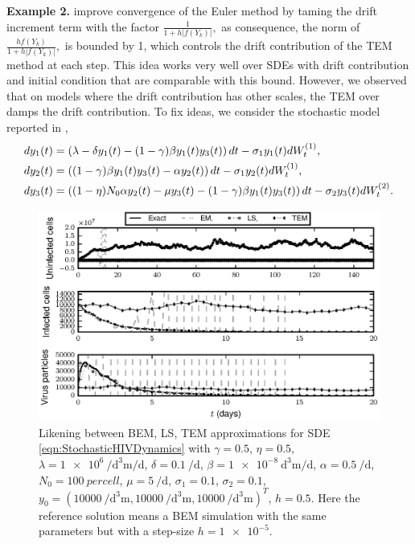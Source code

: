 \documentclass[sort&compress, preprint]{elsarticle}
\theoremstyle{definition}
\theoremstyle{plain}%
\theoremstyle{remark}
\newcommand{\SM}{LS\xspace}
\begin{document}
	
{\textbf{Example 2.}}
	\citeauthor{Hutzenthaler2012a} improve convergence of the Euler method by taming the drift increment term with 
	the factor
	$
	\frac{1}{1 + h |f(Y_k)|},
	$
	as consequence, the norm of  
	$
	\frac{h f(Y_k)}{1 + h |f(Y_k)|},
	$ is bounded by 1, which  controls the drift contribution of the TEM method at each step. This idea works very well
	over SDEs with drift contribution and initial condition that are comparable with this bound. However, we observed
	that on models where the	drift contribution has other scales, the TEM over damps the drift contribution. To fix
	ideas, we consider the	stochastic model reported in \cite{Dalal2008},
	\begin{align}\label{eqn:StochasticHIVDynamics}
	dy_1(t) &=
	\left(
	\lambda -\delta y_1(t) - (1 - \gamma) \beta y_1(t) y_3(t)
	\right)dt
	-\sigma_1 y_1(t) dW^{(1)}_t, 
	\notag \\
	dy_2(t) &= 
	\left(
	(1- \gamma) \beta y_1(t) y_3(t) - \alpha y_2(t) 
	\right)dt
	-\sigma_1 y_2(t) dW^{(1)}_t, 
	\\
	dy_3(t) & = 
	\left(
	(1 - \eta) N_0 \alpha y_2(t) 
	-\mu y_3(t)
	-(1 - \gamma ) \beta y_1(t) y_3(t) 
	\right)dt
	- \sigma_2 y_3(t) dW^{(2)}_t.
	\notag
	\end{align}	
	\begin{figure}[h!]
		\centering
		\includegraphics{InternalHIVDynamics5e-1}
		\caption{
			Likening between BEM, \SM, TEM approximations for SDE \eqref{eqn:StochasticHIVDynamics} with
			$\gamma = \num{0.5}$,
			$\eta = \num{0.5}$,
			$\lambda = \SI{1e6}{\per\cubic\deci\meter\per\day}$,
			$\delta = \SI{0.1}{\per\day}$,
			$\beta = \SI{1e-8}{\cubic\deci\meter\per\day}$,
			$\alpha = \SI{0.5}{\per \day}$,
			$N_0= \SI{100}{per cell}$,
			$\mu = \SI{5}{\per\day} $,
			$\sigma_1 = \num{0.1}$,
			$\sigma_2 = \num{0.1} $,
			$y_0 = (\SI{10000}{\per\cubic\deci\meter}, \SI{10000}{\per\cubic\deci\meter}, 
			\SI{10000}{\per\cubic\deci\meter})^T$,
			$h=\num{0.5}$.
			Here the reference solution means a BEM simulation
			with the same parameters but with a step-size $h=\num{1e-5}$.
		}
		\label{fig:InternalHIVDynamics5e-1}
	\end{figure} 
\end{document}
